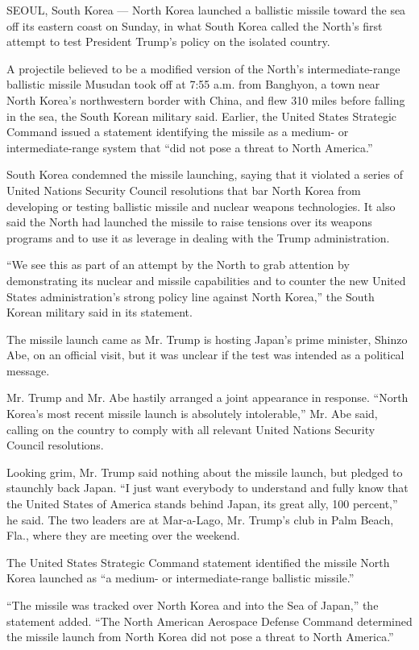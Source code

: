 SEOUL, South Korea --- North Korea launched a ballistic missile toward
the sea off its eastern coast on Sunday, in what South Korea called the
North's first attempt to test President Trump's policy on the isolated
country.

A projectile believed to be a modified version of the North's
intermediate-range ballistic missile Musudan took off at 7:55 a.m. from
Banghyon, a town near North Korea's northwestern border with China, and
flew 310 miles before falling in the sea, the South Korean military
said. Earlier, the United States Strategic Command issued a statement
identifying the missile as a medium- or intermediate-range system that
``did not pose a threat to North America.''

South Korea condemned the missile launching, saying that it violated a
series of United Nations Security Council resolutions that bar North
Korea from developing or testing ballistic missile and nuclear weapons
technologies. It also said the North had launched the missile to raise
tensions over its weapons programs and to use it as leverage in dealing
with the Trump administration.

``We see this as part of an attempt by the North to grab attention by
demonstrating its nuclear and missile capabilities and to counter the
new United States administration's strong policy line against North
Korea,'' the South Korean military said in its statement.

The missile launch came as Mr. Trump is hosting Japan's prime minister,
Shinzo Abe, on an official visit, but it was unclear if the test was
intended as a political message.

Mr. Trump and Mr. Abe hastily arranged a joint appearance in response.
``North Korea's most recent missile launch is absolutely intolerable,''
Mr. Abe said, calling on the country to comply with all relevant United
Nations Security Council resolutions.

Looking grim, Mr. Trump said nothing about the missile launch, but
pledged to staunchly back Japan. ``I just want everybody to understand
and fully know that the United States of America stands behind Japan,
its great ally, 100 percent,'' he said. The two leaders are at
Mar-a-Lago, Mr. Trump's club in Palm Beach, Fla., where they are meeting
over the weekend.

The United States Strategic Command statement identified the missile
North Korea launched as ``a medium- or intermediate-range ballistic
missile.''

``The missile was tracked over North Korea and into the Sea of Japan,''
the statement added. ``The North American Aerospace Defense Command
determined the missile launch from North Korea did not pose a threat to
North America.''

